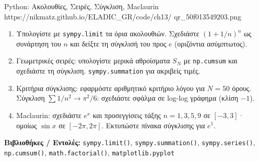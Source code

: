 \begin{pybox}{Python: Ακολουθίες, Σειρές, Σύγκλιση, Maclaurin}%
             {https://nikmatz.github.io/ELADIC_GR/code/ch13/}%
             {qr_50f013549203.png}
\label{py:ch13_sequences_series}
\begin{enumerate}[label=(\alph*),itemsep=2pt]
  \item Υπολογίστε με \texttt{sympy.limit} τα όρια ακολουθιών.
    Σχεδιάστε $(1+1/n)^n$ ως συνάρτηση του $n$ και δείξτε
    τη σύγκλισή του προς $e$ (οριζόντια ασύμπτωτος).
  \item Γεωμετρικές σειρές: υπολογίστε μερικά αθροίσματα
    $S_N$ με \texttt{np.cumsum} και σχεδιάστε τη σύγκλιση.
    \texttt{sympy.summation} για ακριβείς τιμές.
  \item Κριτήρια σύγκλισης: εφαρμόστε αριθμητικό κριτήριο
    λόγου για $N=50$ όρους. Σύγκλιση $\sum 1/n^2 \to \pi^2/6$:
    σχεδιάστε σφάλμα σε log-log γράφημα (κλίση $-1$).
  \item Maclaurin: σχεδιάστε $e^x$ και προσεγγίσεις τάξης
    $n=1,3,5,9$ σε $[-3,3]$· ομοίως $\sin x$ σε $[-2\pi,2\pi]$.
    Εκτυπώστε πίνακα σύγκλισης για $e^1$.
\end{enumerate}
\medskip
\textbf{Βιβλιοθήκες / Εντολές:}
\texttt{sympy.limit()}, \texttt{sympy.summation()},
\texttt{sympy.series()}, \texttt{np.cumsum()},
\texttt{math.factorial()}, \texttt{matplotlib.pyplot}
\end{pybox}
